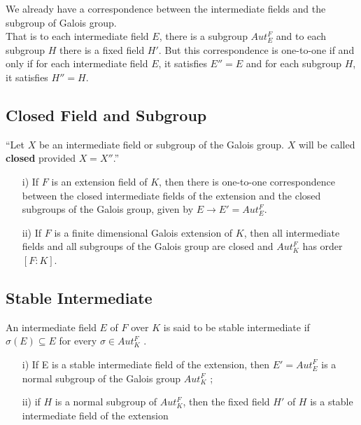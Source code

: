 \vspace{2mm}
We already have a correspondence between the intermediate fields and the subgroup of Galois group.\\
That is to each intermediate field \(E\), there is a subgroup \(Aut_E^F\) and to each subgroup \(H\) there is a fixed field \(H'\). But this correspondence is one-to-one if and only if for each intermediate field \(E\), it satisfies \(E''=E\) and for each subgroup \(H\), it satisfies \(H''=H\).

\subsection{Closed Field and Subgroup}
\begin{definition} \cite{hunger}
  ``Let \(X\) be an intermediate field or subgroup of the Galois group. \(X\) will be called \textbf{closed} provided \(X=X''\).''
\end{definition}
\clearpage

\begin{lemma} \cite{hunger}
\begin{enumerate}
\item[i)] If \(F\) is an extension field of \(K\), then there is one-to-one correspondence between the closed intermediate fields of the extension and the closed subgroups of the Galois group, given by \(E \rightarrow E' =  Aut_E^F\).
\item[ii)] If \(F\) is a finite dimensional Galois extension of \(K\), then all intermediate fields and all subgroups of the Galois group are closed and \(Aut_K^F\) has order \([F:K]\).
  \end{enumerate}
\end{lemma}
\vspace{3mm}

\subsection{Stable Intermediate}
\begin{definition} \cite{hunger}
  An intermediate field \(E\) of \(F\) over \(K\) is said to be stable intermediate if \(\sigma(E) \subseteq E\) for every \(\sigma \in Aut_K^F\) .
\end{definition}

\begin{lemma} \cite{hunger}
  \begin{enumerate}
  \item[i)] If E is a stable intermediate field of the extension, then \(E'=Aut_E^F\) is a normal subgroup of the Galois group \(Aut_K^F\) ;

  \item[ii)] if \(H\) is a normal subgroup of \(Aut_K^F\), then the fixed field \(H'\) of \(H\) is a stable intermediate field of the extension
  \end{enumerate}
\end{lemma}
\vspace{3mm}

